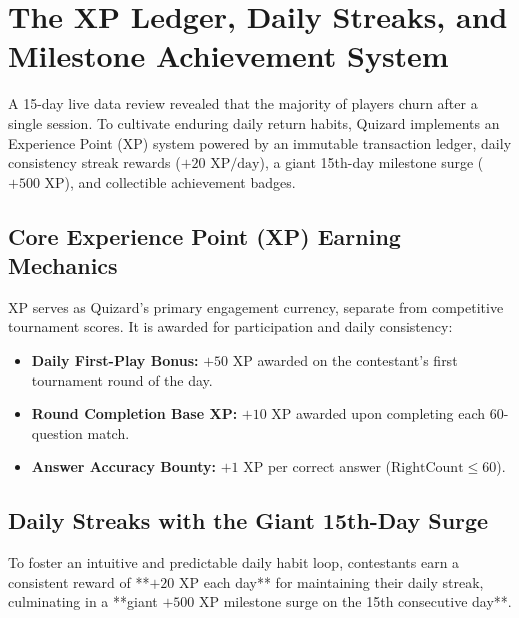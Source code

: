 \chapter{The XP Ledger, Daily Streaks, and Milestone Achievement System}

\begin{tcolorbox}[storybox, title={The Retention Gamification Engine in Brief}]
A 15-day live data review revealed that the majority of players churn after a single session. To cultivate enduring daily return habits, Quizard implements an Experience Point (XP) system powered by an immutable transaction ledger, daily consistency streak rewards ($+20\text{ XP/day}$), a giant 15th-day milestone surge ($+500\text{ XP}$), and collectible achievement badges.
\end{tcolorbox}

\section{Core Experience Point (XP) Earning Mechanics}
XP serves as Quizard's primary engagement currency, separate from competitive tournament scores. It is awarded for participation and daily consistency:

\begin{itemize}
    \item \textbf{Daily First-Play Bonus:} $+50\text{ XP}$ awarded on the contestant's first tournament round of the day.
    \item \textbf{Round Completion Base XP:} $+10\text{ XP}$ awarded upon completing each 60-question match.
    \item \textbf{Answer Accuracy Bounty:} $+1\text{ XP}$ per correct answer ($\text{RightCount} \le 60$).
\end{itemize}

\section{Daily Streaks with the Giant 15th-Day Surge}
To foster an intuitive and predictable daily habit loop, contestants earn a consistent reward of **$+20\text{ XP}$ each day** for maintaining their daily streak, culminating in a **giant $+500\text{ XP}$ milestone surge on the 15th consecutive day**.

